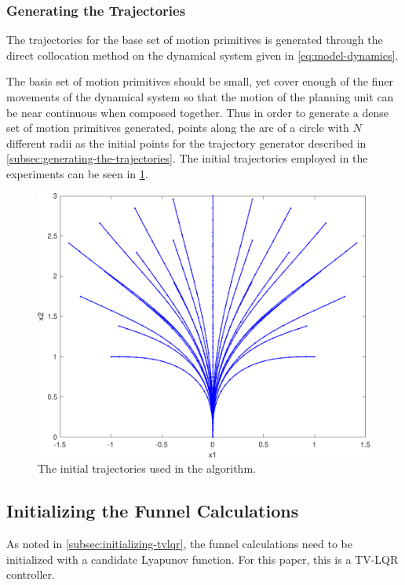 \subsubsection{Generating the Trajectories}

The trajectories for the base set of motion primitives is generated through the
direct collocation method on the dynamical system given in
\eqref{eq:model-dynamics}.

The basis set of motion primitives should be small, yet cover enough of the
finer movements of the dynamical system so that the motion of the planning unit
can be near continuous when composed together. Thus in order to generate a dense
set of motion primitives generated, points along the arc of a circle with \(N\)
different radii as the initial points for the trajectory generator described in
\cref{subsec:generating-the-trajectories}. The initial trajectories employed in
the experiments can be seen in \cref{fig:intial-trajectories-exp}.

\begin{figure}[!t]
  \centering
  \includegraphics[width=.8\columnwidth]{figures/experiments/initial-trajectories}
  \caption[The experiment trajectory set]{The initial trajectories used in the
    \rrtfunnel{} algorithm.}
  \label{fig:intial-trajectories-exp}
\end{figure}



\subsection{Initializing the Funnel Calculations}

As noted in \cref{subsec:initializing-tvlqr}, the funnel calculations need to be
initialized with a candidate Lyapunov function. For this paper, this is a TV-LQR controller.

